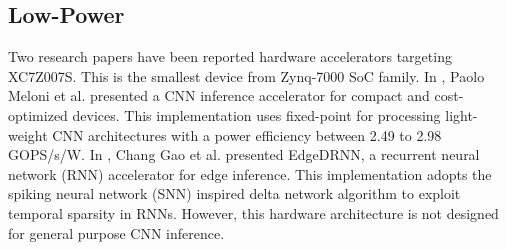 \subsection{Low-Power}
Two research papers have been reported hardware accelerators targeting XC7Z007S. This is the smallest device from Zynq-7000 SoC family. In \cite{meloni2019cnn}, Paolo Meloni et al. presented a CNN inference accelerator for compact and cost-optimized devices. This implementation uses fixed-point for processing light-weight CNN architectures with a power efficiency between 2.49 to 2.98 GOPS/s/W. In \cite{gao2020edgedrnn}, Chang Gao et al. presented EdgeDRNN, a recurrent neural network (RNN) accelerator for edge inference. This implementation adopts the spiking neural network (SNN) inspired delta network algorithm to exploit temporal sparsity in RNNs. However, this hardware architecture is not designed for general purpose CNN inference.